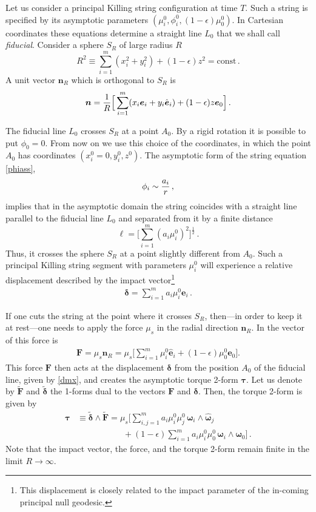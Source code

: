 \documentclass[superscriptaddress,twocolumn,showpacs,
preprintnumbers,amsmath,amssymb,nofootinbib,
longbibliography,aps,prd,10pt]{revtex4-1}
\newcommand{\ts}[1]{{\boldsymbol{#1}}}         %
\newcommand{\be}{\begin{equation}}             %
\newcommand{\ee}{\end{equation}}               %
\newcommand{\n}[1]{\label{#1}}
\begin{document}
Let us consider a principal Killing string configuration at time $T$. Such a  string is specified by its asymptotic parameters $(\mu^0_i, \phi^0_i, (1-\epsilon)\mu_0^0 )$. In Cartesian coordinates these equations determine a straight line $L_0$ that we shall call \emph{fiducial}. Consider a sphere $S_R$ of large radius $R$
\be
R^2\equiv \sum\limits_{i=1}^m (x_i^2+y_i^2)+(1-\epsilon) z^2=\mbox{const}\, .
\ee
A unit vector $\ts{n}_R$ which is orthogonal to $S_R$ is
\be
\ts{n}={1\over R}\Big[\sum\limits_{i=1}^m (x_i \ts{e}_i+y_i \hat{\ts{e}}_i)+(1-\epsilon) z \ts{e}_0\Big]\, .
\ee

The fiducial line $L_0$ crosses  $S_R$ at a point $A_0$. By a rigid rotation it is possible to put $\phi_0=0$. From now on we use this choice of the coordinates, in which the point $A_0$ has coordinates $(x_i^0=0,y_i^0,z^0)$.
The asymptotic form of the string equation \eqref{phiass},
\be
\phi_i\sim {a_i\over r} \, ,
\ee
implies that in the asymptotic domain the string coincides with a straight line parallel to the fiducial line $L_0$ and separated from it by a finite distance
\be
\ell=\Big[ \sum \limits_{i=1}^m (a_i \mu_i^0)^2 \Big]^{\tfrac12}\, .
\ee
Thus, it crosses the sphere $S_R$ at a point slightly different from $A_0$. Such a principal Killing string segment with parameters $\mu^0_i$ will experience a relative displacement described by the impact vector\footnote{This displacement is closely related to the impact parameter of the in-coming principal null geodesic.}
\begin{align}\n{dmx}
\ts{\delta} = \sum\limits_{i=1}^m a_i \mu^0_i \ts{e}_i \, .
\end{align}

If one cuts the string at the point where it crosses $S_R$, then---in order to keep it at rest---one needs to apply the force $\mu_s$ in the radial direction $\ts{n}_R$. In the vector of this force is
\begin{align}
\ts{F} = \mu_s \ts{n}_R = \mu_s \Big[ \sum\limits_{i=1}^m \mu_i^0 \hat{\ts{e}}_i + (1-\epsilon)\mu_0^0 \ts{e}_0 \Big] .
\end{align}
This force $\ts{F}$ then acts at the displacement $\ts{\delta}$ from the position $A_0$ of the fiducial line, given by \eqref{dmx}, and creates the asymptotic torque 2-form $\ts{\tau}$. Let us denote by $\tilde{\ts{F}}$ and $\tilde{\ts{\delta}}$ the 1-forms dual to the vectors $\ts{F}$ and $\ts{\delta}$. Then, the torque 2-form is given by
\begin{align}
\label{eq:torque-2-form}
\ts{\tau} &\equiv \tilde{\ts{\delta}} \wedge \tilde{\ts{F}} = \mu_s \bigg[ \sum\limits_{i,j=1}^m a_i \mu^0_i \mu^0_j\, \ts{\omega}_i \wedge \hat{\ts{\omega}}_j \nonumber \\
&\hspace{65pt}+ (1-\epsilon)\sum\limits_{i=1}^m a_i \mu_i^0 \mu_0^0 \, \ts{\omega}_i \wedge \ts{\omega}_0 \bigg] \, .
\end{align}
Note that the impact vector, the force, and the torque 2-form remain finite in the limit $R\to \infty$.
\end{document}
